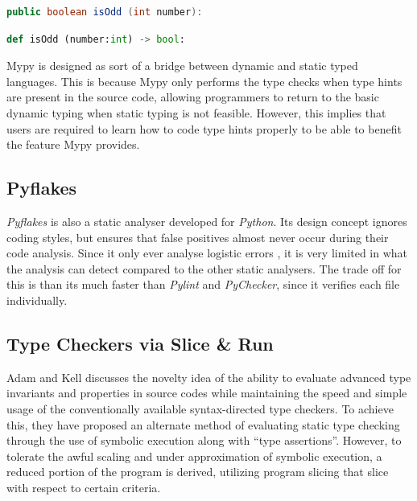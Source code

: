 \documentclass{l4proj}
\begin{document}
\begin{lstlisting}[language=Java , caption= Java function definition, label={lst:java}]
public boolean isOdd (int number):
\end{lstlisting}
\begin{lstlisting}[language=Python, caption= Python function definition with type hints, label={lst:python}]
def isOdd (number:int) -> bool:    
\end{lstlisting}

Mypy is designed as sort of a bridge between dynamic and static typed languages. This is because Mypy only performs the type checks when type hints are present in the source code, allowing programmers to return to the basic dynamic typing when static typing is not feasible. However, this implies that users are required to learn how to code type hints properly to be able to benefit the feature Mypy provides.

\subsection{Pyflakes}
\emph{Pyflakes} is also a static analyser developed for \emph{Python}. Its design concept ignores coding styles, but ensures that false positives almost never occur during their code analysis. Since it only ever analyse logistic errors \cite{stat}, it is very limited in what the analysis can detect compared to the other static analysers. The trade off for this is than its much faster than \emph{Pylint} and \emph{PyChecker}, since it verifies each file individually. 


\subsection{Type Checkers via Slice \& Run}
Adam and Kell \cite{A&K} discusses the novelty idea of the ability to evaluate advanced type invariants and properties in source codes while maintaining the speed and simple usage of the conventionally available syntax-directed type checkers. To achieve this, they have proposed an alternate method of evaluating static type checking through the use of symbolic execution along with “type assertions”. However, to tolerate the awful scaling and under approximation of symbolic execution, a reduced portion of the program is derived, utilizing program slicing that slice with respect to certain criteria. 


\end{document}
